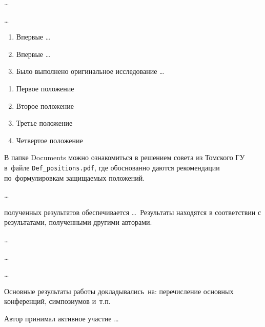 {\researchObject} \ldots


{\researchSubject} \ldots


{\novelty}
\begin{enumerate}
  \item Впервые \ldots
  \item Впервые \ldots
  \item Было выполнено оригинальное исследование \ldots
\end{enumerate}


{}
\begin{enumerate}
  \item Первое положение
  \item Второе положение
  \item Третье положение
  \item Четвертое положение
\end{enumerate}
В папке Documents можно ознакомиться в решением совета из Томского ГУ
в~файле \verb+Def_positions.pdf+, где обоснованно даются рекомендации
по~формулировкам защищаемых положений. 


{\methods} \ldots


{\reliability} полученных результатов обеспечивается \ldots \ Результаты находятся в соответствии с результатами, полученными другими авторами.


{\influenceTheor} \ldots


{\influence} \ldots


{\deployment} \ldots


{\probation}
Основные результаты работы докладывались~на:
перечисление основных конференций, симпозиумов и~т.\:п.


{\contribution} Автор принимал активное участие \ldots


